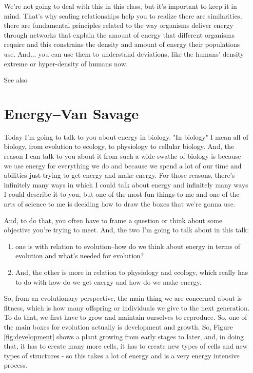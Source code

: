 \documentclass[]{article}
\begin{document}
We're not going to deal with this
in this class,
but it's important to keep it in mind.
That's why scaling relationships help you
to realize there are similarities,
there are fundamental principles
related to the way
organisms deliver energy
through networks
that explain the amount of energy
that different organisms require
and this constrains the density
and amount of energy
their populations use.
And... you can use them
to understand deviations,
like the humans' density extreme
or hyper-density of humans now.

See also \cite{white2012methodological,sibly2012metabolic,tucker2014evolutionary,anderson2013altered,enquist2012land,west1997general,damuth1981population,enquist1998allometric,marquet2005scaling} 

\section[Energy]{Energy--Van Savage}


Today I'm going to talk to you
about energy in biology.
"In biology" I mean all of biology,
from evolution to ecology,
to physiology to cellular biology.
And, the reason I can talk to you about it
from such a wide swathe of biology
is because we use energy
for everything we do
and because we spend a lot
of our time and abilities
just trying to get energy
and make energy.
For those reasons,
there's infinitely many ways
in which I could talk about energy
and infinitely many ways
I could describe it to you,
but one of the most fun things to me
and one of the arts of science to me
is deciding how to draw the boxes
that we're gonna use.

And, to do that,
you often have to frame a question
or think about some objective
you're trying to meet.
And, the two I'm going to talk about
in this talk:
\begin{enumerate}
	\item one is with relation to evolution--how do we think about energy in terms of evolution and what's needed for evolution?

	\item And, the other is more in relation to physiology and ecology, which really has to do with how do we get energy and how do we make energy.

\end{enumerate}

So, from an evolutionary perspective,
the main thing we are concerned about
is fitness,
which is how many offspring
or individuals
we give to the next generation.
To do that, we first have to grow
and maintain ourselves to reproduce.
So, one of the main boxes for evolution
actually is development and growth.
So, Figure \ref{fig:development} shows a plant growing
from early stages to later,
and, in doing that,
it has to create many more cells,
it has to create new types of cells
and new types of structures -
so this takes a lot of energy
and is a very energy intensive process.
\end{document}
